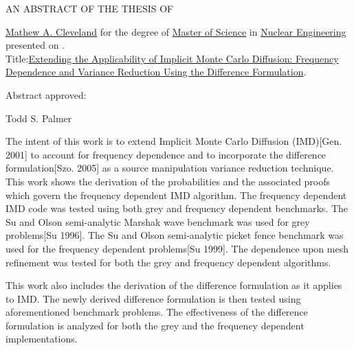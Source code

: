 
\begin{center} AN ABSTRACT OF THE THESIS OF  \end{center}

\thispagestyle{empty}

\belowSecSkip

\ResetSingleSpace

\noindent \underline{Mathew A. Cleveland} for the degree of 
	  \underline{Master of Science} in
	  \underline{Nuclear Engineering} presented on 
	  \underline{\myDefenseDate}. \\
	  Title:\hfill\underline{Extending the Applicability of Implicit Monte Carlo Diffusion: Frequency }
	  \underline{ Dependence and Variance Reduction Using the Difference Formulation}.

\vskip0.3in

\noindent Abstract approved: \hspace{0.25in} \hrulefill\




	  
\noindent \hspace{3.25in} Todd S. Palmer \hfill

\vskip0.25in



\ResetDoubleSpace

\noindent 
	\indent The intent of this work is to extend Implicit Monte Carlo Diffusion (IMD)[Gen. 2001] to account for frequency dependence and to incorporate the difference formulation[Szo. 2005] as a source manipulation variance reduction technique. This work shows the derivation of the probabilities and the associated proofs which govern the frequency dependent IMD algorithm. The frequency dependent IMD code was tested using both grey and frequency dependent benchmarks. The Su and Olson semi-analytic Marshak wave benchmark was used for grey problems[Su 1996]. The Su and Olson semi-analytic picket fence benchmark was used for the frequency dependent problems[Su 1999]. The dependence upon mesh refinement was tested for both the grey and frequency dependent algorithms.

	This work also includes the derivation of the difference formulation as it applies to IMD. The newly derived difference formulation is then tested using aforementioned benchmark problems. The effectiveness of the difference formulation is analyzed for both the grey and the frequency dependent implementations.

